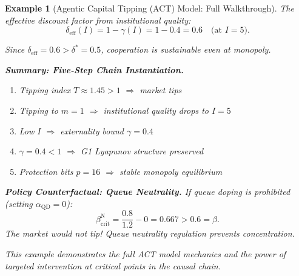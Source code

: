 \documentclass[12pt]{article}
\newtheorem{example}[theorem]{Example}
\begin{document}
\begin{example}[Agentic Capital Tipping (ACT) Model: Full Walkthrough]
The effective discount factor from institutional quality:
\[
\delta_{\text{eff}}(I) = 1 - \gamma(I) = 1 - 0.4 = 0.6 \quad \text{(at } I = 5\text{)}.
\]

Since $\delta_{\text{eff}} = 0.6 > \delta^* = 0.5$, cooperation is sustainable even at monopoly.

\textbf{Summary: Five-Step Chain Instantiation.}
\begin{enumerate}
    \item Tipping index $T \approx 1.45 > 1$ $\Rightarrow$ market tips
    \item Tipping to $m = 1$ $\Rightarrow$ institutional quality drops to $I = 5$
    \item Low $I$ $\Rightarrow$ externality bound $\gamma = 0.4$
    \item $\gamma = 0.4 < 1$ $\Rightarrow$ G1 Lyapunov structure preserved
    \item Protection bits $p = 16$ $\Rightarrow$ stable monopoly equilibrium
\end{enumerate}

\textbf{Policy Counterfactual: Queue Neutrality.}
If queue doping is prohibited (setting $\alpha_{\text{QD}} = 0$):
\[
\beta_{\text{crit}}^{\text{N}} = \frac{0.8}{1.2} - 0 = 0.667 > 0.6 = \beta.
\]
The market would not tip! Queue neutrality regulation prevents concentration.

This example demonstrates the full ACT model mechanics and the power of targeted intervention at critical points in the causal chain.
\end{example}

\end{document}
